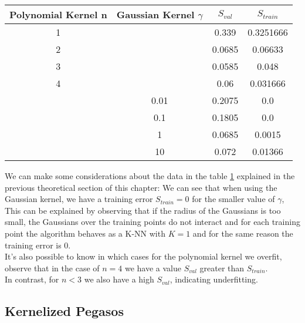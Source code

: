 \begin{table}[]
    \begin{tabular}{|c|c|c|c|}
        \hline
        Polynomial Kernel n & Gaussian Kernel $\gamma$ & $S_{val}$ & $S_{train}$ \\ \hline
        1 & & 0.339 & 0.3251666 \\ \hline
    2 & & 0.0685 & 0.06633 \\ \hline
    3 & & 0.0585 & 0.048 \\ \hline
    4 & & 0.06 & 0.031666 \\ \hline
    & 0.01 & 0.2075 & 0.0 \\ \hline
    & 0.1 & 0.1805 & 0.0 \\ \hline
    & 1  & 0.0685 & 0.0015 \\ \hline
     & 10 & 0.072 & 0.01366 \\ \hline    
    \end{tabular}
    \label{tab:kper}
\end{table}
We can make some considerations about the data in the table \ref{tab:kper} explained in the previous theoretical section of this chapter:
We can see that when using the Gaussian kernel, we have a training error $S_{train} = 0$ for the smaller value of $\gamma$, 
This can be explained by observing that if the radius of the Gaussians is too small, the Gaussians over the training points do not interact and for each training point the algorithm behaves as a K-NN with $K = 1$ and for the same reason the training error is 0.\\
It's also possible to know in which cases for the polynomial kernel we overfit, observe that in the case of $n = 4$ we have a value $S_{val}$ greater than $S_{train}$.\\
In contrast, for $n < 3$ we also have a high $S_{val}$, indicating underfitting.\\
\subsection{Kernelized Pegasos}

